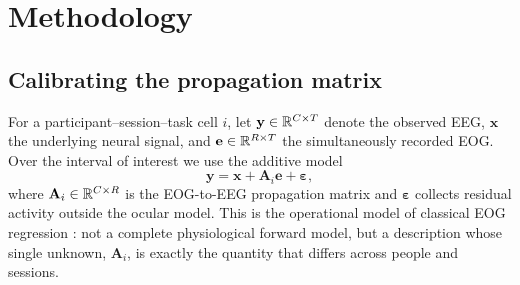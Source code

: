 \section{Methodology}
\label{sec:methodology}

\subsection{Calibrating the propagation matrix}
\label{sec:method-calibration}

For a participant--session--task cell $i$, let $\mathbf{y}\in\mathbb{R}^{C\times T}$ denote the observed EEG, $\mathbf{x}$ the underlying neural signal, and $\mathbf{e}\in\mathbb{R}^{R\times T}$ the simultaneously recorded EOG. Over the interval of interest we use the additive model
\begin{equation}
  \mathbf{y}=\mathbf{x}+\mathbf{A}_i\mathbf{e}+\boldsymbol{\varepsilon},
  \label{eq:observation}
\end{equation}
where $\mathbf{A}_i\in\mathbb{R}^{C\times R}$ is the EOG-to-EEG propagation matrix and $\boldsymbol{\varepsilon}$ collects residual activity outside the ocular model. This is the operational model of classical EOG regression \cite{gratton1983ocular}: not a complete physiological forward model, but a description whose single unknown, $\mathbf{A}_i$, is exactly the quantity that differs across people and sessions.


